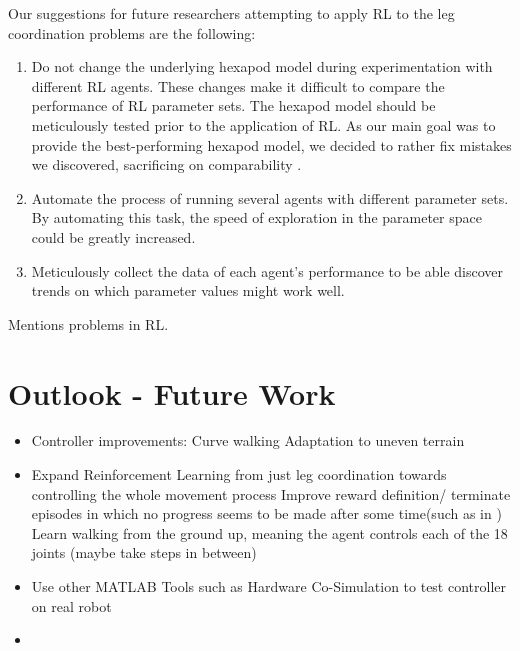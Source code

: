 Our suggestions for future researchers attempting to apply RL to the leg coordination problems are the following:
\begin{enumerate}
	\item Do not change the underlying hexapod model during experimentation with different RL agents. 
	These changes make it difficult to compare the performance of RL parameter sets.
	The hexapod model should be meticulously tested prior to the application of RL.
	As our main goal was to provide the best-performing hexapod model, we decided to rather fix mistakes we discovered, sacrificing on comparability .
	
	\item Automate the process of running several agents with different parameter sets. 
	By automating this task, the speed of exploration in the parameter space could be greatly increased.
	
	\item Meticulously collect the data of each agent's performance to be able discover trends on which parameter values might work well.
	
\end{enumerate}

Mentions problems in RL.



\section{Outlook - Future Work}



\begin{itemize}
	
	\item Controller improvements:
		\subitem Curve walking
		\subitem Adaptation to uneven terrain
		\subitem 
	
	\item Expand Reinforcement Learning from just leg coordination towards controlling the whole movement process
		\subitem Improve reward definition/ terminate episodes in which no progress seems to be made after some time(such as in \cite{lillicrap2015continuous})
		\subitem Learn walking from the ground up, meaning the agent controls each of the 18 joints (maybe take steps in between)
		\subitem
	
	\item Use other MATLAB Tools such as Hardware Co-Simulation to test controller on real robot
	
	\item 
	
\end{itemize}
